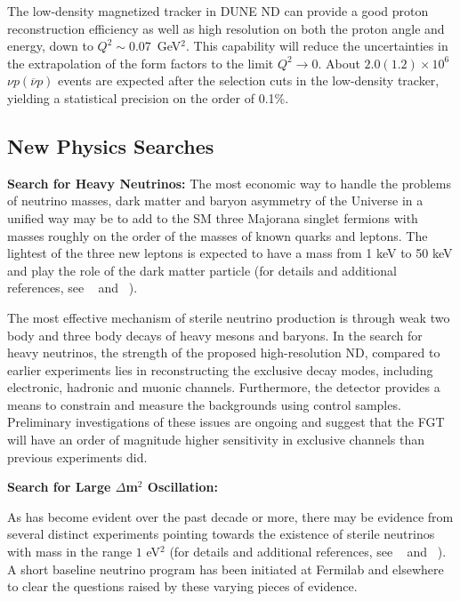 The low-density magnetized tracker in DUNE ND can provide a good proton reconstruction efficiency as well as
high resolution on both the proton angle and energy, down to $Q^2\sim0.07$~GeV$^2$. 
This capability will reduce the uncertainties in the extrapolation of the form factors to the limit
$Q^2 \to 0$. About $2.0 (1.2) \times 10^6$ $\nu p
(\overline{\nu} p)$ events are expected after the selection cuts in
the low-density tracker, yielding a statistical precision on the order
of 0.1\%.



\subsection{New Physics Searches} 
\label{sec-nd-np} 

\vspace{0.25cm} 
\noindent 
{\bf Search for Heavy Neutrinos:} 
The most economic way to handle the problems of neutrino masses, dark matter and baryon asymmetry of the Universe in a unified way may be to add to the SM three Majorana singlet fermions with masses roughly on the order of the masses of known quarks and leptons. 
 The lightest of the three new leptons is expected to have a mass from 1 keV to 50 keV and play the role of the dark matter particle (for details and additional references, see ~\cite{DPR} and ~\cite{Adams:2013qkq}).

The most effective  mechanism of sterile neutrino production is through weak two body and three body decays of heavy mesons and baryons. In the search for heavy neutrinos, the strength of the proposed high-resolution ND, compared to earlier experiments lies in reconstructing the exclusive decay modes, including electronic, hadronic and muonic channels. Furthermore, the detector provides a means to constrain and measure the backgrounds using control samples. Preliminary investigations of these issues are ongoing and  suggest that the FGT  will have an order of magnitude higher sensitivity in exclusive channels than previous experiments did. 

\vspace{0.25cm} 
\noindent 
{\bf Search for Large $\Delta$m$^2$ Oscillation:} 

As has become evident over the past decade or more, there may be evidence from several distinct experiments pointing towards the existence of sterile neutrinos with mass in the range $1$ eV$^2$ (for details and additional references, see ~\cite{DPR} and ~\cite{Adams:2013qkq}).  A short baseline neutrino program has been initiated at Fermilab and elsewhere to clear the questions raised by these varying pieces of evidence.  

